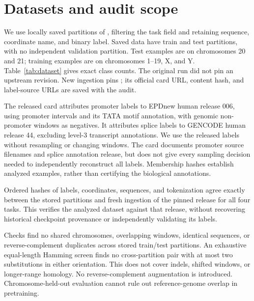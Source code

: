 \section{Datasets and audit scope}
We use locally saved partitions of , filtering the task field and retaining sequence, coordinate name, and binary label. Saved data have train and test partitions, with no independent validation partition. Test examples are on chromosomes 20 and 21; training examples are on chromosomes 1--19, X, and Y. Table~\ref{tab:dataset} gives exact class counts. The original run did not pin an upstream revision. New ingestion pins ; its official card URL, content hash, and label-source URLs are saved with the audit.

The released card attributes promoter labels to EPDnew human release 006, using promoter intervals and its TATA motif annotation, with genomic non-promoter windows as negatives. It attributes splice labels to GENCODE human release 44, excluding level-3 transcript annotations. We use the released labels without resampling or changing windows. The card documents promoter source filenames and splice annotation release, but does not give every sampling decision needed to independently reconstruct all labels. Membership hashes establish analyzed examples, rather than certifying the biological annotations.

Ordered hashes of labels, coordinates, sequences, and tokenization agree exactly between the stored partitions and fresh ingestion of the pinned release for all four tasks. This verifies the analyzed dataset against that release, without recovering historical checkpoint provenance or independently validating its labels.
\begin{table}[t]
\centering\normalsize
\caption{Exact stored class counts. Membership, coordinates, sequence hashes, and orientation-canonical hashes are saved as JSONL.}
\label{tab:dataset}
\DatasetTable
\end{table}

Checks find no shared chromosomes, overlapping windows, identical sequences, or reverse-complement duplicates across stored train/test partitions. An exhaustive equal-length Hamming screen finds no cross-partition pair with at most two substitutions in either orientation. This does not cover indels, shifted windows, or longer-range homology. No reverse-complement augmentation is introduced. Chromosome-held-out evaluation cannot rule out reference-genome overlap in pretraining.

